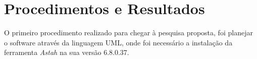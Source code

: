 \section{Procedimentos e Resultados}
	
	\par O primeiro procedimento realizado para chegar à pesquisa proposta, foi
planejar o software através da linguagem UML, onde foi necessário a instalação
da ferramenta \textit{Astah} na sua versão 6.8.0.37.
